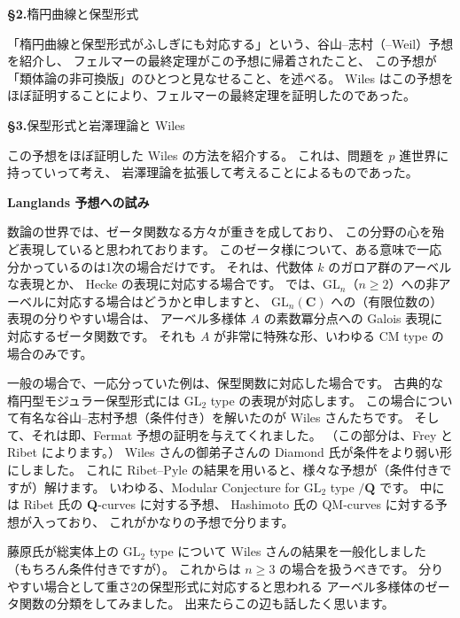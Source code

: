 \documentclass[uplatex,dvipdfmx]{jlreq}
\begin{document}
\medskip
\noindent\textbf{\S2.}\quad 楕円曲線と保型形式

「楕円曲線と保型形式がふしぎにも対応する」という、谷山--志村（--Weil）予想を紹介し、
フェルマーの最終定理がこの予想に帰着されたこと、
この予想が「類体論の非可換版」のひとつと見なせること、を述べる。
Wiles はこの予想をほぼ証明することにより、フェルマーの最終定理を証明したのであった。

\medskip
\noindent\textbf{\S3.}\quad 保型形式と岩澤理論と Wiles

この予想をほぼ証明した Wiles の方法を紹介する。
これは、問題を $p$ 進世界に持っていって考え、
岩澤理論を拡張して考えることによるものであった。

\newpage

\noindent
{\large\bfseries Langlands 予想への試み}

\bigskip
\hspace*{\fill}{\large\bfseries 百瀬　文之（中大・理工）}

\bigskip

数論の世界では、ゼータ関数なる方々が重きを成しており、
この分野の心を殆ど表現していると思われております。
このゼータ様について、ある意味で一応分かっているのは1次の場合だけです。
それは、代数体 $k$ のガロア群のアーベルな表現とか、
Hecke の表現に対応する場合です。
では、$\mathrm{GL}_n$（$n \geq 2$）への非アーベルに対応する場合はどうかと申しますと、
$\mathrm{GL}_n(\mathbf{C})$ への（有限位数の）表現の分りやすい場合は、
アーベル多様体 $A$ の素数冪分点への Galois 表現に対応するゼータ関数です。
それも $A$ が非常に特殊な形、いわゆる CM type の場合のみです。

一般の場合で、一応分っていた例は、保型関数に対応した場合です。
古典的な楕円型モジュラー保型形式には $\mathrm{GL}_2$ type の表現が対応します。
この場合について有名な谷山--志村予想（条件付き）を解いたのが Wiles さんたちです。
そして、それは即、Fermat 予想の証明を与えてくれました。
（この部分は、Frey と Ribet によります。）
Wiles さんの御弟子さんの Diamond 氏が条件をより弱い形にしました。
これに Ribet--Pyle の結果を用いると、様々な予想が（条件付きですが）解けます。
いわゆる、Modular Conjecture for $\mathrm{GL}_2$ type $/\mathbf{Q}$ です。
中には Ribet 氏の $\mathbf{Q}$-curves に対する予想、
Hashimoto 氏の QM-curves に対する予想が入っており、
これがかなりの予想で分ります。

藤原氏が総実体上の $\mathrm{GL}_2$ type について Wiles さんの結果を一般化しました
（もちろん条件付きですが）。
これからは $n \geq 3$ の場合を扱うべきです。
分りやすい場合として重さ2の保型形式に対応すると思われる
アーベル多様体のゼータ関数の分類をしてみました。
出来たらこの辺も話したく思います。
\end{document}
